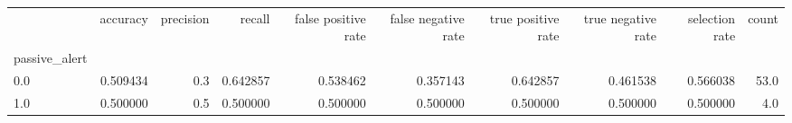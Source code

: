 \begin{tabular}{lrrrrrrrrr}
\toprule
{} &  accuracy &  precision &    recall &  false positive rate &  false negative rate &  true positive rate &  true negative rate &  selection rate &  count \\
passive\_alert &           &            &           &                      &                      &                     &                     &                 &        \\
\midrule
0.0           &  0.509434 &        0.3 &  0.642857 &             0.538462 &             0.357143 &            0.642857 &            0.461538 &        0.566038 &   53.0 \\
1.0           &  0.500000 &        0.5 &  0.500000 &             0.500000 &             0.500000 &            0.500000 &            0.500000 &        0.500000 &    4.0 \\
\bottomrule
\end{tabular}
